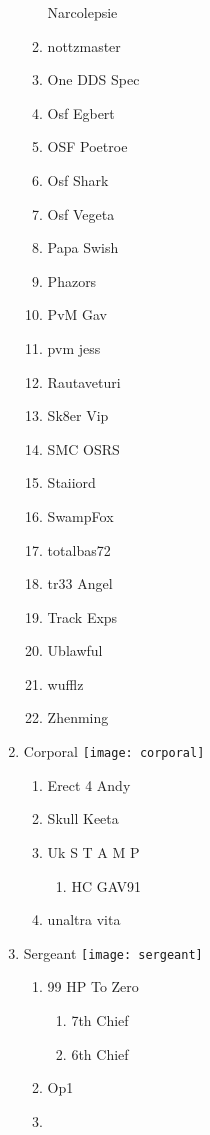 \documentclass{article}
\begin{document}
\begin{enumerate}[I]
\begin{enumerate}[I]
	Narcolepsie
      \item
	nottzmaster
      \item
	One DDS Spec
      \item
	Osf Egbert
      \item
	OSF Poetroe
      \item
	Osf Shark
      \item
	Osf Vegeta
      \item
	Papa Swish
      \item
	Phazors
      \item
	PvM Gav
      \item
	pvm jess
      \item
	Rautaveturi
      \item
	Sk8er Vip
      \item
	SMC OSRS
      \item
	Staiiord
      \item
	SwampFox
      \item
	totalbas72
      \item
	tr33 Angel
      \item
	Track Exps
      \item
	Ublawful
      \item
	wufflz
      \item
	Zhenming
    \end{enumerate}
  \item
    Corporal \texttt{[image: corporal]}
    \begin{enumerate}[I]
      \item
	Erect 4 Andy
      \item
	Skull Keeta
      \item
	Uk S T A M P
	\begin{enumerate}[I]
	  \item
	    HC GAV91
	\end{enumerate}
      \item
	unaltra vita
    \end{enumerate}
  \item
    Sergeant \texttt{[image: sergeant]}
    \begin{enumerate}[I]
      \item 
	99 HP To Zero
	\begin{enumerate}[I]
	  \item
	    7th Chief
	  \item
	    6th Chief
	\end{enumerate}
      \item
	Op1
      \item

\end{enumerate}
\end{enumerate}
\end{document}
